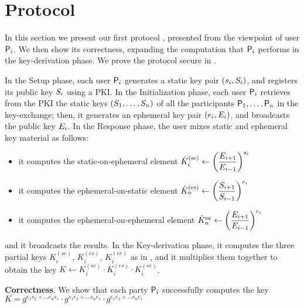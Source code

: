 \section{Protocol}\label{sec:protocol}
In this section we present our first protocol , presented from the viewpoint of user $\User[i]$.
We then show its correctness, expanding the computation that $\User[i]$ performs in the key-derivation phase.
We prove the protocol secure  in .

In the Setup phase, each user $\User[i]$ generates a static key pair $(\ssk_i,\spk_i)$, and registers its public key $\spk_i$ using a PKI.
In the Initialization phase, each user $\User[i]$ retrieves from the PKI the static keys $(\spk_1,\dots,\spk_n)$ of all the participants $\User[1],\dots,\User[n]$  in the key-exchange; then, it generates an ephemeral key pair $(\esk_i,\epk_i)$, and broadcasts the public key $\epk_i$. 
In the Response phase, the user mixes static and ephemeral key material as follows:
\begin{itemize}
	\item it computes the static-on-ephemeral element $\hat{K}_i^\text{(se)} \gets \left( \dfrac{\epk_{i+1}}{\epk_{i-1}}\right)^{\ssk_i}$
	\item it computes the ephemeral-on-static element $\hat{K}_n^\text{(es)} \gets \left( \dfrac{\spk_{i+1}}{\spk_{i-1}}\right)^{\esk_i}$
	\item it computes the ephemeral-on-ephemeral element $\hat{K}_n^\text{ee} \gets \left( \dfrac{\epk_{i+1}}{\epk_{i-1}}\right)^{\esk_i}$ 
\end{itemize}
and it broadcasts the results.
In the Key-derivation phase, it computes the three partial keys $K_i^{(se)}$, $K_i^{(es)}$, $K_i^{(ee)}$ as in , and it multiplies them together to obtain the key $K \gets K_i^{(se)} \cdot K_i^{(es)} \cdot K_i^{(ee)}$.

\textbf{Correctness}. We show that each party $\User[i]$ successfully computes the key $K = g^{e_1s_2 + \dots e_ns_1}\cdot g^{s_1e_2 + \dots s_ne_1}\cdot g^{e_1e_2 + \dots e_ne_1}$

